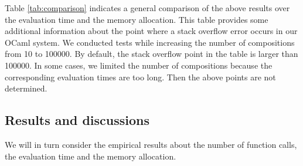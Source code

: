 Table \ref{tab:comparison} indicates a general comparison of the above results over the evaluation time and the memory allocation. This table provides some additional information about the point where a stack overflow error occurs in our OCaml system. We conducted tests while increasing the number of compositions from 10 to 100000. By default, the stack overflow point in the table is larger than 100000. In some cases, we limited the number of compositions because the corresponding evaluation times are too long. Then the above points are not determined.  

\subsection{Results and discussions}

We will in turn consider the empirical results about the number of function calls, the evaluation time and the memory allocation.\\

